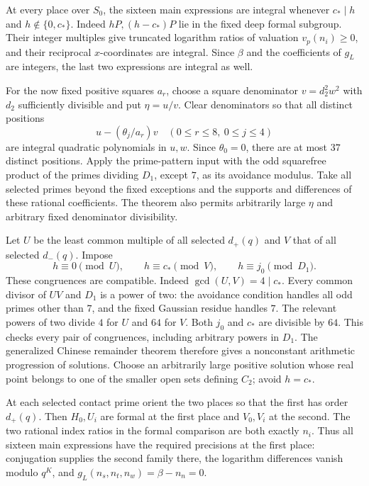 At every place over $S_0$, the sixteen main expressions are integral
whenever $c_*\mid h$ and $h\notin\{0,c_*\}$. Indeed $hP,(h-c_*)P$ lie
in the fixed deep formal subgroup. Their integer multiples give truncated
logarithm ratios of valuation $v_p(n_i)\ge0$, and their reciprocal
$x$-coordinates are integral. Since $\beta$ and the coefficients of
$g_L$ are integers, the last two expressions are integral as well.

For the now fixed positive squares $a_r$, choose a square denominator
$v=d_2^2w^2$ with $d_2$ sufficiently divisible and put $\eta=u/v$.
Clear denominators so that all distinct positions
\begin{equation}\label{sd:positions}
             u-(\theta_j/a_r)v
       \quad(0\le r\le8,\ 0\le j\le4)
\end{equation}
are integral quadratic polynomials in $u,w$. Since $\theta_0=0$, there
are at most $37$ distinct positions. Apply the prime-pattern input with
the odd squarefree product of the primes dividing $D_1$, except $7$, as
its avoidance modulus. Take all selected primes beyond the fixed
exceptions and the supports and differences of these rational coefficients.
The theorem also permits arbitrarily large $\eta$ and arbitrary fixed
denominator divisibility.

Let $U$ be the least common multiple of all selected $d_+(q)$ and $V$ that
of all selected $d_-(q)$. Impose
\begin{equation}\label{sd:CRT}
 h\equiv0\pmod U,\qquad h\equiv c_*\pmod V,
 \qquad h\equiv j_0\pmod{D_1}.
\end{equation}
These congruences are compatible. Indeed $\gcd(U,V)=4\mid c_*$.
Every common divisor of $UV$ and $D_1$ is a power of two: the avoidance
condition handles all odd primes other than $7$, and the fixed Gaussian
residue handles $7$. The relevant powers of two divide $4$ for $U$ and
$64$ for $V$. Both $j_0$ and $c_*$ are divisible by $64$.
This checks every pair of congruences, including arbitrary powers in
$D_1$. The generalized Chinese remainder theorem therefore gives a
nonconstant arithmetic progression of solutions. Choose an arbitrarily
large positive solution whose real point belongs to one of the smaller
open sets defining $C_2$; avoid $h=c_*$.

At each selected contact prime orient the two places so that the first
has order $d_+(q)$. Then $H_0,U_i$ are formal at the first place and
$V_0,V_i$ at the second. The two rational index ratios in the formal
comparison are both exactly $n_i$. Thus all sixteen main expressions
have the required precisions at the first place: conjugation supplies
the second family there, the logarithm differences vanish modulo $q^K$,
and $g_L(n_s,n_t,n_w)=\beta-n_n=0$.

